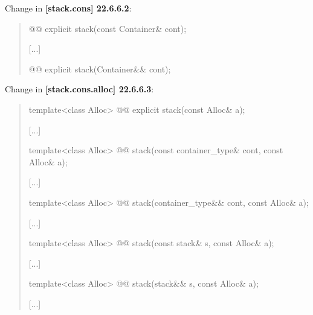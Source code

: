 \documentclass{wg21}
\begin{document}
Change in \textbf{[stack.cons] 22.6.6.2}:
\begin{quote}
\begin{itemdecl}
@@ explicit stack(const Container& cont);
\end{itemdecl}
[...]
\begin{itemdecl}
@@ explicit stack(Container&& cont);
\end{itemdecl}
\end{quote}

Change in \textbf{[stack.cons.alloc] 22.6.6.3}:
\begin{quote}
\begin{itemdecl}
template<class Alloc> @@ explicit stack(const Alloc& a);
\end{itemdecl}
[...]
\begin{itemdecl}
template<class Alloc> @@ stack(const container_type& cont, const Alloc& a);	
\end{itemdecl}
[...]
\begin{itemdecl}
template<class Alloc> @@ stack(container_type&& cont, const Alloc& a);	
\end{itemdecl}
[...]
\begin{itemdecl}
template<class Alloc> @@ stack(const stack& s, const Alloc& a);	
\end{itemdecl}
[...]
\begin{itemdecl}
template<class Alloc> @@ stack(stack&& s, const Alloc& a);	
\end{itemdecl}
[...]
\end{quote}
\end{document}
